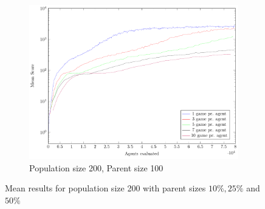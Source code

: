 \begin{figure}
\begin{subfigure}[b]{0.49\textwidth}
    	\caption{Population size 200, Parent size 100}
        \includegraphics[width=\textwidth]{data/ce_population_offspring/200x_split/constant_l200_o100/mean/PlotFile.pdf}
    \end{subfigure}
    
    \caption{Mean results for population size 200 with parent sizes $10 \% , 25 \%$ and $50 \%$}
\end{figure}

\clearpage

